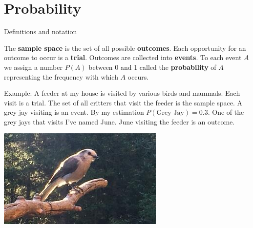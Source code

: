 \documentclass[
  ignorenonframetext,
]{beamer}
\begin{document}
\hypertarget{probability}{%
\section{Probability}\label{probability}}

\begin{frame}{Definitions and notation}
\protect\hypertarget{definitions-and-notation}{}

The \textbf{sample space} is the set of all possible \textbf{outcomes}.
Each opportunity for an outcome to occur is a \textbf{trial}. Outcomes
are collected into \textbf{events}. To each event \(A\) we assign a
number \(P(A)\) between 0 and 1 called the \textbf{probability} of \(A\)
representing the frequency with which \(A\) occurs.

\footnotesize

Example: A feeder at my house is visited by various birds and mammals.
Each visit is a trial. The set of all critters that visit the feeder is
the sample space. A grey jay visiting is an event. By my estimation
\(P(\text{Grey Jay})=0.3\). One of the grey jays that visits I've named
June. June visiting the feeder is an outcome.

\includegraphics[width=\textwidth,height=0.4\textheight]{grey_jay.jpg}

\end{frame}
\end{document}
